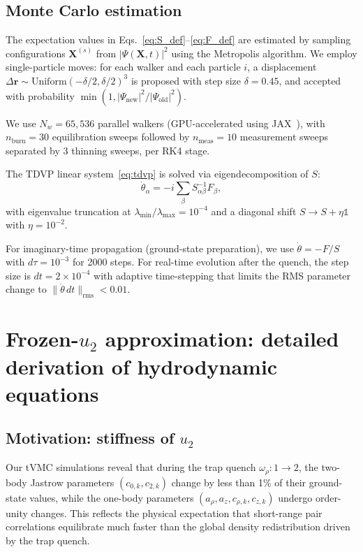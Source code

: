 \documentclass[aps,prl,onecolumn,superscriptaddress,longbibliography,nofootinbib]{revtex4-2}
\newcommand{\br}{\mathbf{r}}
\newcommand{\bx}{\mathbf{X}}
\begin{document}
\subsection{Monte Carlo estimation}

The expectation values in Eqs.~\eqref{eq:S_def}--\eqref{eq:F_def} are
estimated by sampling configurations $\bx^{(s)}$ from $|\Psi(\bx,t)|^2$
using the Metropolis algorithm.  We employ single-particle moves:
for each walker and each particle $i$, a displacement
$\Delta\br\sim\mathrm{Uniform}(-\delta/2,\delta/2)^3$ is proposed
with step size $\delta=0.45$, and accepted with probability
$\min(1,|\Psi_{\mathrm{new}}|^2/|\Psi_{\mathrm{old}}|^2)$.

We use $N_w=65{,}536$ parallel walkers (GPU-accelerated using
JAX~\cite{Bradbury2018}), with $n_{\mathrm{burn}}=30$ equilibration
sweeps followed by $n_{\mathrm{meas}}=10$ measurement sweeps separated
by 3 thinning sweeps, per RK4 stage.

The TDVP linear system~\eqref{eq:tdvp} is solved via eigendecomposition
of $S$:
\begin{equation}
\dot\theta_\alpha = -i\sum_\beta S^{-1}_{\alpha\beta}F_\beta,
\end{equation}
with eigenvalue truncation at $\lambda_{\min}/\lambda_{\max}=10^{-4}$
and a diagonal shift $S\to S+\eta\mathbb{1}$ with $\eta=10^{-2}$.

For imaginary-time propagation (ground-state preparation), we use
$\dot\theta = -F/S$ with $d\tau=10^{-3}$ for 2000 steps.  For
real-time evolution after the quench, the step size is
$dt=2\times10^{-4}$ with adaptive time-stepping that limits the RMS
parameter change to $\|\dot\theta\,dt\|_{\mathrm{rms}}<0.01$.

\section{Frozen-$u_2$ approximation: detailed derivation of
hydrodynamic equations}
\label{sec:frozen_derivation}

\subsection{Motivation: stiffness of $u_2$}

Our tVMC simulations reveal that during the trap quench
$\omega_\rho:1\to 2$, the two-body Jastrow parameters $(c_{0,k},
c_{2,k})$ change by less than 1\% of their ground-state values, while
the one-body parameters $(a_\rho, a_z, c_{\rho,k}, c_{z,k})$ undergo
order-unity changes.  This reflects the physical expectation that
short-range pair correlations equilibrate much faster than the global
density redistribution driven by the trap quench.
\end{document}
